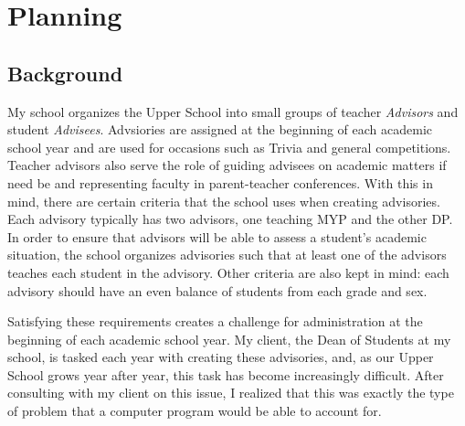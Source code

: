 \documentclass{paper}
\begin{document}
\insertTitlePage
{}
\tableofcontents
\thispagestyle{frontorback}
\newpage
\setcounter{page}{1}
\justifying

\section{Planning}
\label{sec:planning}
\subsection{Background}
My school organizes the Upper School into small groups of teacher \textit{Advisors} and student \textit{Advisees}.
Advsiories are assigned at the beginning of each academic school year and are used for occasions such as Trivia and general competitions.
Teacher advisors also serve the role of guiding advisees on academic matters if need be and representing faculty in parent-teacher conferences.
With this in mind, there are certain criteria that the school uses when creating advisories.
Each advisory typically has two advisors, one teaching MYP and the other DP.
In order to ensure that advisors will be able to assess a student's academic situation, the school organizes advisories such that at least one of the advisors teaches each student in the advisory.
Other criteria are also kept in mind: each advisory should have an even balance of students from each grade and sex.

Satisfying these requirements creates a challenge for administration at the beginning of each academic school year.
My client, the Dean of Students at my school, is tasked each year with creating these advisories, and, as our Upper School grows year after year, this task has become increasingly difficult.
After consulting with my client on this issue, I realized that this was exactly the type of problem that a computer program would be able to account for.
\end{document}
